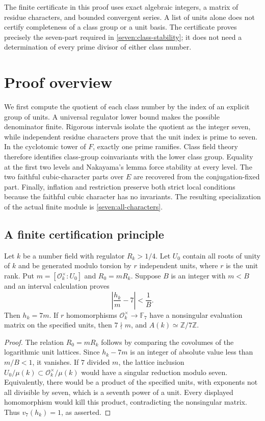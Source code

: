 The finite certificate in this proof uses exact algebraic integers, a
matrix of residue characters, and bounded convergent series. A list of
units alone does not certify completeness of a class group or a unit
basis. The certificate proves precisely the seven-part required in
\eqref{seven:class-stability}; it does not need a determination of every
prime divisor of either class number.

\section*{Proof overview}

We first compute the quotient of each class number by the index of an
explicit group of units. A universal regulator lower bound makes the
possible denominator finite. Rigorous intervals isolate the quotient as
the integer seven, while independent residue characters prove that the
unit index is prime to seven. In the cyclotomic tower of $F$, exactly one
prime ramifies. Class field theory therefore identifies class-group
coinvariants with the lower class group. Equality at the first two levels
and Nakayama's lemma force stability at every level. The two faithful
cubic-character parts over $E$ are recovered from the conjugation-fixed
part. Finally, inflation and restriction preserve both strict local
conditions because the faithful cubic character has no invariants.
The resulting specialization of the actual finite module is
\eqref{seven:all-characters}.

\subsection{A finite certification principle}
\label{seven:finite-principle}

\begin{lemma}\label{seven:isolation}
Let $k$ be a number field with regulator $R_k>1/4$. Let $U_0$ contain all
roots of unity of $k$ and be generated modulo torsion by $r$ independent
units, where $r$ is the unit rank. Put
$m=[\mathcal O_k^\times:U_0]$ and $R_0=mR_k$.
Suppose $B$ is an integer with $m<B$ and an interval calculation proves
\[
 \left|\frac{h_k}{m}-7\right|<\frac1B.
 \tag{S5}\label{seven:isolation-bound}
\]
Then $h_k=7m$. If $r$ homomorphisms
$\mathcal O_k^\times\longrightarrow\mathbb F_7$ have a nonsingular
evaluation matrix on the specified units, then $7\nmid m$, and
$A(k)\simeq\mathbb Z/7\mathbb Z$.
\end{lemma}

\begin{proof}
The relation $R_0=mR_k$ follows by comparing the covolumes of the logarithmic
unit lattices. Since $h_k-7m$ is an integer of absolute value less than
$m/B<1$, it vanishes. If $7$ divided $m$, the lattice inclusion
$U_0/\mu(k)\subset\mathcal O_k^\times/\mu(k)$ would have a singular
reduction modulo seven. Equivalently, there would be a product of the
specified units, with exponents not all divisible by seven, which is a
seventh power of a unit. Every displayed homomorphism would kill this
product, contradicting the nonsingular matrix. Thus
$v_7(h_k)=1$, as asserted.
\end{proof}

